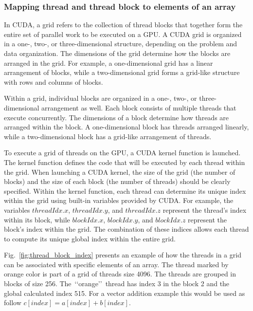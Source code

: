 \subsubsection{Mapping thread and thread block to elements of an array}


\par
In CUDA, a grid refers to the collection of thread blocks that together form the entire set of parallel work to be executed on a GPU. 
A CUDA grid is organized in a one-, two-, or three-dimensional structure, depending on the problem and data organization.
The dimensions of the grid determine how the blocks are arranged in the grid.
For example, a one-dimensional grid has a linear arrangement of blocks, while a two-dimensional grid forms a grid-like structure with rows and columns of blocks.


\par
Within a grid, individual blocks are organized in a one-, two-, or three-dimensional arrangement as well.
Each block consists of multiple threads that execute concurrently.
The dimensions of a block determine how threads are arranged within the block.
A one-dimensional block has threads arranged linearly, while a two-dimensional block has a grid-like arrangement of threads.


\par
To execute a grid of threads on the GPU, a CUDA kernel function is launched.
The kernel function defines the code that will be executed by each thread within the grid.
When launching a CUDA kernel, the size of the grid (the number of blocks) and the size of each block (the number of threads) should be clearly specified.
Within the kernel function, each thread can determine its unique index within the grid using built-in variables provided by CUDA.
For example, the variables $threadIdx.x$, $threadIdx.y$, and $threadIdx.z$ represent the thread's index within its block, while $blockIdx.x$, $blockIdx.y$, and $blockIdx.z$ represent the block's index within the grid.
The combination of these indices allows each thread to compute its unique global index within the entire grid.


\par
Fig.~\ref{fig:thread_block_index} presents an example of how the threads in a grid can be associated with specific elements of an array.
The thread marked by orange color is part of a grid of threads size 4096.
The threads are grouped in blocks of size 256.
The~\lq\lq orange\rq\rq~thread has index 3 in the block 2 and the global calculated index 515.
For a vector addition example this would be used as follow $c[index] = a[index] + b[index]$.


